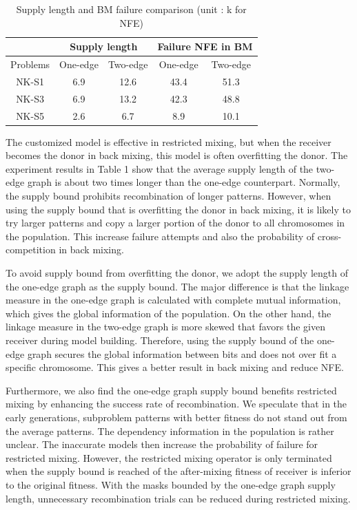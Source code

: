 \documentclass{sig-alternate-05-2015}
\begin{document}
\begin{table}[ht]
\begin{tabular}{|c|c|c|c|c|}
\hline
 &
\multicolumn{2}{c|}{Supply length} &
\multicolumn{2}{c|}{Failure NFE in BM} \\
\hline
Problems  & One-edge & Two-edge & One-edge & Two-edge \\\hline
NK-S1 &  6.9 &12.6  &43.4 & 51.3 \\\hline
NK-S3 & 6.9  & 13.2  &42.3 & 48.8 \\\hline
NK-S5 & 2.6  &6.7  &  8.9& 10.1 \\\hline

\end{tabular}
\caption{Supply length and BM failure comparison (unit : k for NFE)}
\end{table}


The customized model is effective in restricted mixing, but when the receiver becomes the donor in back mixing, this model is often overfitting the donor. The experiment results in Table 1 show that the average supply length of the two-edge graph is about two times longer than the one-edge counterpart. Normally, the supply bound prohibits recombination of longer patterns. However, when using the supply bound that is overfitting the donor in back mixing, it is likely to try larger patterns and copy a larger portion of the donor to all chromosomes in the population. This increase failure attempts and also the probability of cross-competition in back mixing. 

To avoid supply bound from overfitting the donor, we adopt the supply length of the one-edge graph as the supply bound. The major difference is that the linkage measure in the one-edge graph is calculated with complete mutual information, which gives the global information of the population. On the other hand, the linkage measure in the two-edge graph is more skewed that favors the given receiver during model building. Therefore, using the supply bound of the one-edge graph secures the global information between bits and does not over fit a specific chromosome. This gives a better result in back mixing and reduce NFE.


Furthermore, we also find the one-edge graph supply bound benefits restricted mixing by enhancing the success rate of recombination. We speculate that in the early generations, subproblem patterns with better fitness do not stand out from the average patterns. The dependency information in the population is rather unclear. The inaccurate models then increase the probability of failure for restricted mixing. However, the restricted mixing operator is only terminated when the supply bound is reached of the after-mixing fitness of receiver is inferior to the original fitness. With the masks bounded by the one-edge graph supply length, unnecessary recombination trials can be reduced during restricted mixing. 
\end{document}
